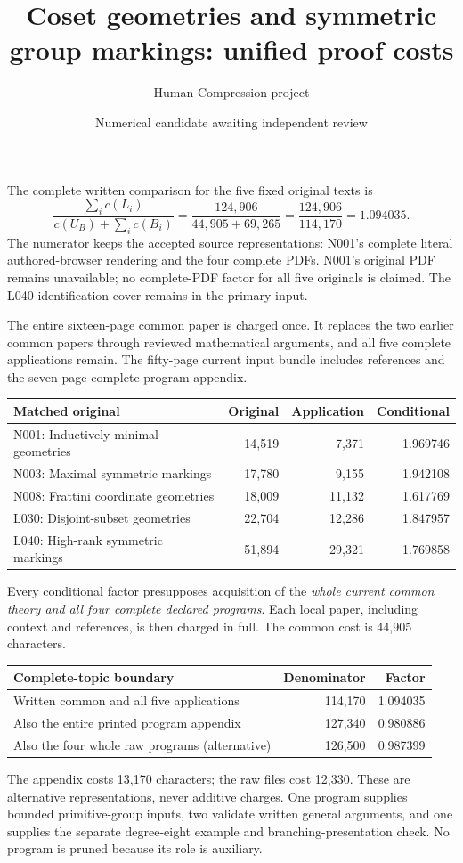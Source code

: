 \documentclass[11pt,a4paper]{article}
\title{Coset geometries and symmetric group markings: unified proof costs}
\author{Human Compression project}\date{Numerical candidate awaiting independent review}
\begin{document}
\maketitle
The complete written comparison for the five fixed original texts is
\[
 \frac{\sum_i c(L_i)}{c(U_B)+\sum_i c(B_i)}
 =\frac{124,906}{44,905+69,265}
 =\frac{124,906}{114,170}=\mathbf{1.094035}.
\]
The numerator keeps the accepted source representations: N001's complete literal authored-browser rendering and the four complete PDFs. N001's original PDF remains unavailable; no complete-PDF factor for all five originals is claimed. The L040 identification cover remains in the primary input.

The entire sixteen-page common paper is charged once. It replaces the two earlier common papers through reviewed mathematical arguments, and all five complete applications remain. The fifty-page current input bundle includes references and the seven-page complete program appendix.

\begin{center}\begin{tabular}{lrrr}\toprule
Matched original & Original & Application & Conditional\\\midrule
N001: Inductively minimal geometries & 14,519 & 7,371 & 1.969746\\
N003: Maximal symmetric markings & 17,780 & 9,155 & 1.942108\\
N008: Frattini coordinate geometries & 18,009 & 11,132 & 1.617769\\
L030: Disjoint-subset geometries & 22,704 & 12,286 & 1.847957\\
L040: High-rank symmetric markings & 51,894 & 29,321 & 1.769858\\
\bottomrule\end{tabular}\end{center}
Every conditional factor presupposes acquisition of the \emph{whole current common theory and all four complete declared programs}. Each local paper, including context and references, is then charged in full. The common cost is 44,905 characters.

\begin{center}\begin{tabular}{lrr}\toprule
Complete-topic boundary & Denominator & Factor\\\midrule
Written common and all five applications &114,170&1.094035\\
Also the entire printed program appendix &127,340&0.980886\\
Also the four whole raw programs (alternative) &126,500&0.987399\\\bottomrule
\end{tabular}\end{center}
The appendix costs 13,170 characters; the raw files cost 12,330. These are alternative representations, never additive charges. One program supplies bounded primitive-group inputs, two validate written general arguments, and one supplies the separate degree-eight example and branching-presentation check. No program is pruned because its role is auxiliary.
\end{document}
